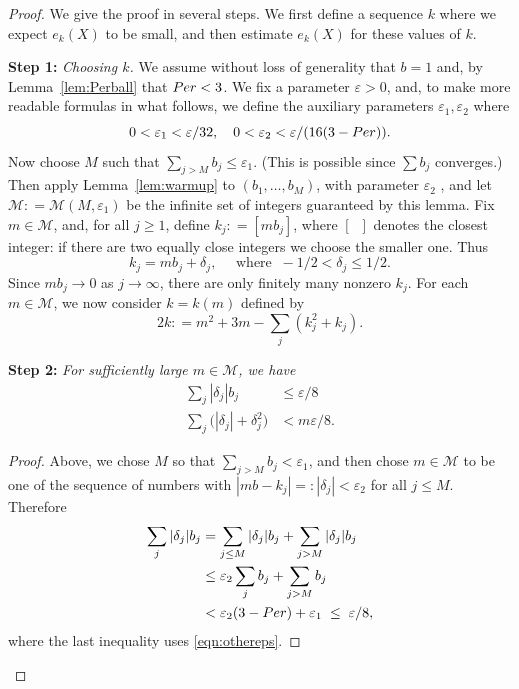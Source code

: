 \documentclass[10pt,a4paper]{amsart}
\newcommand{\MS}{{\medskip}}
\newcommand{\Mm}{{\mathcal M}}
\newcommand{\NI}{{\noindent}}
\newcommand{\Per}{{\rm Per}}
\newcommand{\de}{{\delta}}
\newcommand{\eps}{\varepsilon}
\begin{document}
\begin{proof}
We give the proof in several steps. We first define a sequence $k$ where we expect $e_k(X) $ to be small, and then estimate $e_k(X) $
for these values of $k$.  \MS

\NI
{\bf Step 1:} {\it Choosing  $k$.} 
We assume without loss of generality that $b = 1$ and, by Lemma~\ref{lem:Perball} that $\Per < 3$. We fix  a parameter $\eps> 0$, and, to make more readable formulas in what follows, 
we define the auxiliary parameters $\eps_1, \eps_2$ where
\begin{equation}
\label{eqn:othereps}
0<\eps_1 < \eps/32, \quad 0<\eps_2 < \eps/(16 (3-\Per)).
\end{equation}
 Now choose $M$ such that $\sum_{j > M} b_j \le \eps_1.$  (This is possible since $\sum b_j$ converges.)
 Then apply Lemma~\ref{lem:warmup}  to $(b_1,\ldots,b_M)$, with parameter $\eps_2$ , and let $\Mm: = \Mm(M,\eps_1)$ be the infinite set of integers  guaranteed by this lemma.  Fix $m\in \Mm$, and, for
all $j\ge 1$, define $k_j: = [ m b_j]$, where $[\;\; ]$ denotes the closest integer:
 if there are two equally close integers we choose the smaller one.  
 Thus
 $$k_j = m b_j + \delta_j, \quad \mbox{ where } \ -1/2 < \delta_j \le 1/2.
 $$
Since $m b_j\to 0$ as $j\to \infty$, there are only finitely many  nonzero $k_j.$  
 For each $m\in \Mm$, we now consider $k = k(m)$ defined by 
\begin{equation}
\label{eqn:defnk}
2k: = m^2 + 3m - \sum_j  (k_j^2 + k_j).
\end{equation}



\NI
{\bf Step 2:} {\it For sufficiently large $m\in \Mm$, we have}
\begin{align} \label{eqn:easy} \sum_j |\delta_j| b_j&\le \eps/8
\\  \label{eqn:slightlydelicate} 
\sum_j\bigl( |\delta_j| + \delta_j^2\bigr) &< m \eps/8.
\end{align}

\begin{proof} Above, we chose $M$ so that $\sum_{j>M} b_j < \eps_1$, and then chose $m\in \Mm$ to be one of the sequence of numbers
with  $|mb - k_j| =:|\de_j|< \eps_2$ for all $j\le M$.
Therefore 
\begin{align*}
\sum_j |\delta_j| b_j & = \sum_{j\le M} |\delta_j| b_j + \sum_{j> M} |\delta_j| b_j \\
& \le \eps_2 \sum_j b_j + \sum_{j>M} b_j \\
& < \eps_2 (3-\Per) + \eps_1\;  \le \; \eps/8,
\end{align*}
where the last inequality uses \eqref{eqn:othereps}.


\end{proof}
\end{proof}
\end{document}

